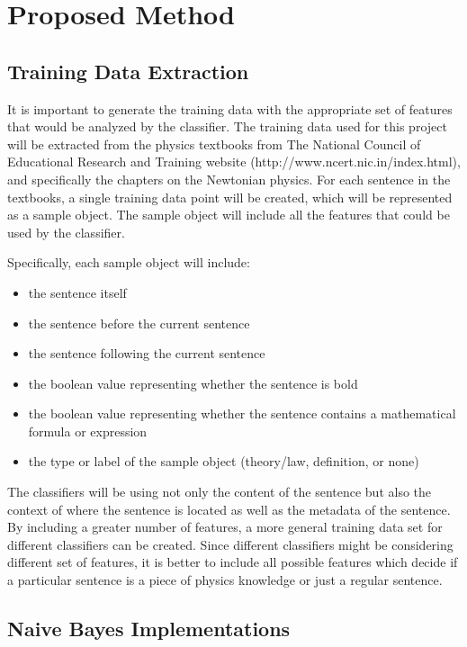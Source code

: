 \documentclass{article} %
\begin{document}
\section{Proposed Method}

\subsection{Training Data Extraction}

It is important to generate the training data with the appropriate set of features that would be analyzed by the classifier. The training data used for this project will be extracted from the physics textbooks from The National Council of Educational Research and Training website (http://www.ncert.nic.in/index.html), and specifically the chapters on the Newtonian physics. For each sentence in the textbooks, a single training data point will be created, which will be represented as a sample object. The sample object will include all the features that could be used by the classifier.

Specifically, each sample object will include:
\begin{itemize}
	\item the sentence itself
	\item the sentence before the current sentence
	\item the sentence following the current sentence
	\item the boolean value representing whether the sentence is bold
	\item the boolean value representing whether the sentence contains a mathematical formula or expression
	\item the type or label of the sample object (theory/law, definition, or none)
\end{itemize}
The classifiers will be using not only the content of the sentence but also the context of where the sentence is located as well as the metadata of the sentence. By including a greater number of features, a more general training data set for different classifiers can be created. Since different classifiers might be considering different set of features, it is better to include all possible features which decide if a particular sentence is a piece of physics knowledge or just a regular sentence.

\subsection{Naive Bayes Implementations}
\end{document}
